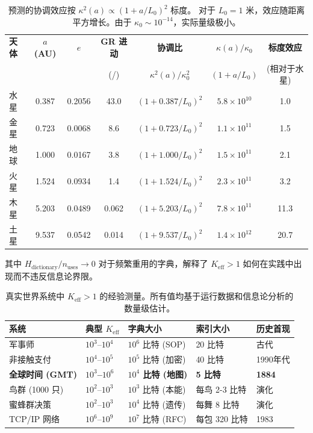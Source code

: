 \documentclass[11pt,a4paper]{article}
\begin{document}
	\begin{table}[htbp]
		\centering
		\footnotesize
		\begin{tabular}{lcccccc}
			\toprule
			\textbf{天体} & \textbf{$a$ (AU)} & \textbf{$e$} & \textbf{GR 进动} & \textbf{协调比} & \textbf{$\kappa(a)/\kappa_0$} & \textbf{标度效应} \\
			& & & (\text{角秒}/\text{世纪}) & $\kappa^2(a)/\kappa_0^2$ & $(1 + a/L_0)$ & (相对于水星) \\
			\midrule
			水星 & 0.387 & 0.2056 & 43.0 & $(1 + 0.387/L_0)^2$ & $5.8\times10^{10}$ & 1.0 \\
			金星 & 0.723 & 0.0068 & 8.6 & $(1 + 0.723/L_0)^2$ & $1.1\times10^{11}$ & 1.5 \\
			地球 & 1.000 & 0.0167 & 3.8 & $(1 + 1.000/L_0)^2$ & $1.5\times10^{11}$ & 2.1 \\
			火星 & 1.524 & 0.0934 & 1.4 & $(1 + 1.524/L_0)^2$ & $2.3\times10^{11}$ & 3.2 \\
			木星 & 5.203 & 0.0489 & 0.062 & $(1 + 5.203/L_0)^2$ & $7.8\times10^{11}$ & 11.3 \\
			土星 & 9.537 & 0.0542 & 0.014 & $(1 + 9.537/L_0)^2$ & $1.4\times10^{12}$ & 20.7 \\
			\bottomrule
		\end{tabular}
		\caption{预测的协调效应按 $\kappa^2(a) \propto (1 + a/L_0)^2$ 标度。
			对于 $L_0 = 1$ 米，效应随距离平方增长。由于 $\kappa_0 \sim 10^{-14}$，实际量级极小。}
		\label{tab:solar-system-keff}
	\end{table}
	其中 $H_{\text{dictionary}}/n_{\text{uses}} \to 0$ 对于频繁重用的字典，解释了 $K_{\mathrm{eff}} > 1$ 如何在实践中出现而不违反信息论界限。
	
	\begin{table}[htbp]
		\centering
		\small
		\begin{tabular}{p{}p{}p{}p{}p{}}
			\toprule
			\textbf{系统} & \textbf{典型 $K_{\mathrm{eff}}$} & \textbf{字典大小} & \textbf{索引大小} & \textbf{历史首现} \\
			\midrule
			军事师 & $10^3$--$10^4$ & $10^6$ 比特 (SOP) & 20 比特 & 古代 \\
			非接触支付 & $10^4$--$10^5$ & $10^5$ 比特 (加密) & 40 比特 & 1990年代 \\
			\textbf{全球时间 (GMT)} & \textbf{$10^3$--$10^6$} & \textbf{$10^4$ 比特 (地图)} & \textbf{5 比特} & \textbf{1884} \\
			鸟群 (1000 只) & $10^2$--$10^3$ & $10^3$ 比特 (本能) & 每鸟 2-3 比特 & 演化 \\
			蜜蜂群决策 & $10^2$--$10^3$ & $10^4$ 比特 (遗传) & 每舞 8 比特 & 演化 \\
			TCP/IP 网络 & $10^6$--$10^9$ & $10^7$ 比特 (RFC) & 每包 320 比特 & 1983 \\
			\bottomrule
		\end{tabular}
		\caption{真实世界系统中 $K_{\mathrm{eff}} > 1$ 的经验测量。所有值均基于运行数据和信息论分析的数量级估计。}
		\label{tab:empirical-keff}
	\end{table}
	
\end{document}

